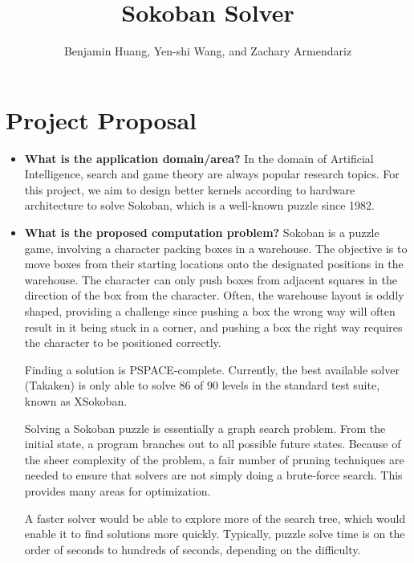 \documentclass[10pt, notitlepage]{article}
\title{\textbf{Sokoban Solver}}
\author{Benjamin Huang, Yen-shi Wang, and Zachary Armendariz}
\date{}
\begin{document}
\maketitle

\vspace*{-55pt}

\section*{Project Proposal}
\begin{itemize}
    \item \textbf{What is the application domain/area?} In the domain of Artificial Intelligence, search and game theory are always popular research topics. For this project, we aim to design better kernels according to hardware architecture to solve Sokoban, which is a well-known puzzle since 1982.
    
    \item \textbf{What is the proposed computation problem?} Sokoban is a puzzle game, involving a character packing boxes in a warehouse. The objective is to move boxes from their starting locations onto the designated positions in the warehouse. The character can only push boxes from adjacent squares in the direction of the box from the character. Often, the warehouse layout is oddly shaped, providing a challenge since pushing a box the wrong way will often result in it being stuck in a corner, and pushing a box the right way requires the character to be positioned correctly.
    
    Finding a solution is PSPACE-complete. Currently, the best available solver (Takaken) is only able to solve 86 of 90 levels in the standard test suite, known as XSokoban.
    
    Solving a Sokoban puzzle is essentially a graph search problem. From the initial state, a program branches out to all possible future states. Because of the sheer complexity of the problem, a fair number of pruning techniques are needed to ensure that solvers are not simply doing a brute-force search. This provides many areas for optimization.
    
    A faster solver would be able to explore more of the search tree, which would enable it to find solutions more quickly. Typically, puzzle solve time is on the order of seconds to hundreds of seconds, depending on the difficulty.


\end{itemize}
\end{document}
